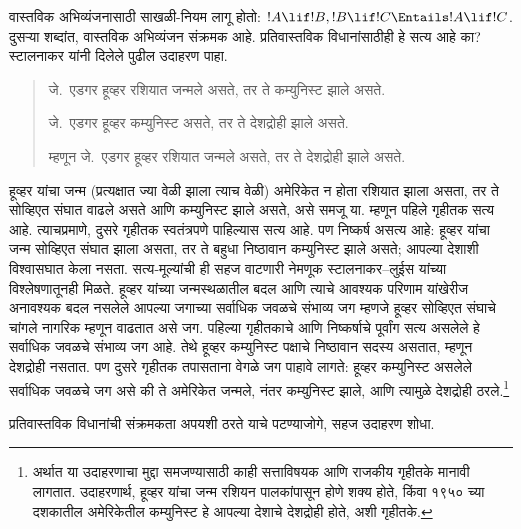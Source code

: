 \documentclass[../../../include/open-logic-section]{subfiles}
\begin{document}


वास्तविक अभिव्यंजनासाठी
साखळी-नियम लागू होतो:
$!A \lif !B, !B
\lif !C \Entails !A \lif !C$.
दुसऱ्या शब्दांत,
वास्तविक अभिव्यंजन
संक्रमक आहे.
प्रतिवास्तविक विधानांसाठीही
हे सत्य आहे का?
स्टालनाकर यांनी दिलेले
पुढील उदाहरण पाहा.
\begin{quote}
  जे.~एडगर हूव्हर रशियात
  जन्मले असते, तर ते
  कम्युनिस्ट झाले असते.

  जे.~एडगर हूव्हर कम्युनिस्ट
  असते, तर ते देशद्रोही
  झाले असते.

  म्हणून जे.~एडगर हूव्हर
  रशियात जन्मले असते,
  तर ते देशद्रोही
  झाले असते.
\end{quote}
हूव्हर यांचा जन्म
(प्रत्यक्षात ज्या वेळी झाला
त्याच वेळी) अमेरिकेत
न होता रशियात झाला
असता, तर ते
सोव्हिएत संघात वाढले
असते आणि कम्युनिस्ट
झाले असते, असे
समजू या. म्हणून
पहिले गृहीतक सत्य
आहे. त्याचप्रमाणे,
दुसरे गृहीतक
स्वतंत्रपणे पाहिल्यास
सत्य आहे. पण
निष्कर्ष असत्य आहे:
हूव्हर यांचा जन्म
सोव्हिएत संघात
झाला असता, तर
ते बहुधा निष्ठावान
कम्युनिस्ट झाले
असते; आपल्या
देशाशी विश्वासघात
केला नसता.
सत्य-मूल्यांची ही
सहज वाटणारी
नेमणूक स्टालनाकर--लुईस
यांच्या विश्लेषणातूनही
मिळते. हूव्हर यांच्या
जन्मस्थळातील बदल आणि त्याचे आवश्यक परिणाम
यांखेरीज अनावश्यक बदल नसलेले आपल्या जगाच्या
सर्वाधिक जवळचे
संभाव्य जग म्हणजे
हूव्हर सोव्हिएत
संघाचे चांगले नागरिक
म्हणून वाढतात
असे जग. पहिल्या
गृहीतकाचे आणि
निष्कर्षाचे पूर्वांग
सत्य असलेले हे
सर्वाधिक जवळचे
संभाव्य जग आहे.
तेथे हूव्हर
कम्युनिस्ट पक्षाचे
निष्ठावान सदस्य
असतात, म्हणून
देशद्रोही नसतात.
पण दुसरे गृहीतक
तपासताना वेगळे
जग पाहावे लागते:
हूव्हर कम्युनिस्ट
असलेले सर्वाधिक
जवळचे जग असे
की ते अमेरिकेत
जन्मले, नंतर
कम्युनिस्ट झाले,
आणि त्यामुळे
देशद्रोही ठरले.\footnote{
  अर्थात या उदाहरणाचा
  मुद्दा समजण्यासाठी
  काही सत्ताविषयक
  आणि राजकीय
  गृहीतके मानावी
  लागतात. उदाहरणार्थ,
  हूव्हर यांचा जन्म
  रशियन पालकांपासून
  होणे शक्य होते,
  किंवा १९५० च्या
  दशकातील अमेरिकेतील
  कम्युनिस्ट हे आपल्या
  देशाचे देशद्रोही होते,
  अशी गृहीतके.}

\begin{prob}
  प्रतिवास्तविक विधानांची
  संक्रमकता अपयशी
  ठरते याचे पटण्याजोगे,
  सहज उदाहरण शोधा.
\end{prob}
\end{document}
